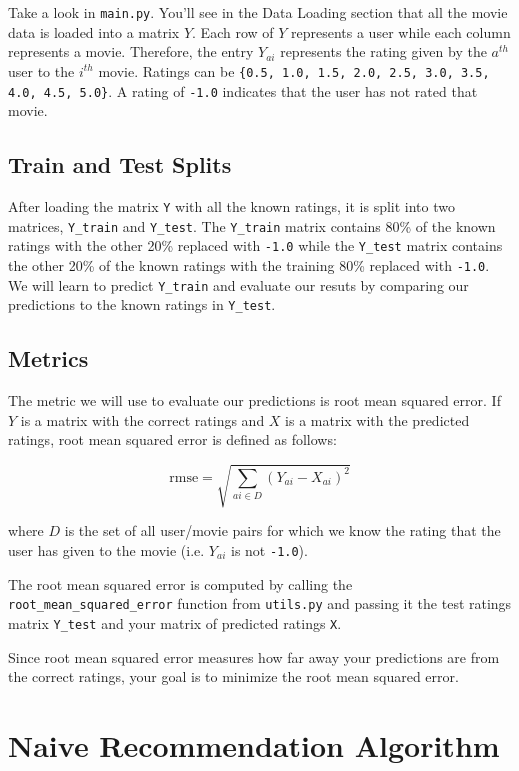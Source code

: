 \documentclass{article}
\begin{document}
Take a look in \texttt{main.py}. You'll see in the Data Loading section that all the movie data is loaded into a matrix $Y$. Each row of $Y$ represents a user while each column represents a movie. Therefore, the entry $Y_{ai}$ represents the rating given by the $a^{th}$ user to the $i^{th}$ movie. Ratings can be \texttt{\{0.5, 1.0, 1.5, 2.0, 2.5, 3.0, 3.5, 4.0, 4.5, 5.0\}}. A rating of \texttt{-1.0} indicates that the user has not rated that movie.

\subsection{Train and Test Splits}

After loading the matrix \texttt{Y} with all the known ratings, it is split into two matrices, \texttt{Y\_train} and \texttt{Y\_test}. The \texttt{Y\_train} matrix contains 80\% of the known ratings with the other 20\% replaced with \texttt{-1.0} while the \texttt{Y\_test} matrix contains the other 20\% of the known ratings with the training 80\% replaced with \texttt{-1.0}. We will learn to predict \texttt{Y\_train} and evaluate our resuts by comparing our predictions to the known ratings in \texttt{Y\_test}.

\subsection{Metrics}

The metric we will use to evaluate our predictions is root mean squared error. If $Y$ is a matrix with the correct ratings and $X$ is a matrix with the predicted ratings, root mean squared error is defined as follows:

$$\textrm{rmse} = \sqrt{\sum_{ai \in D} (Y_{ai} - X_{ai})^2}$$

\noindent
where $D$ is the set of all user/movie pairs for which we know the rating that the user has given to the movie (i.e. $Y_{ai}$ is not \texttt{-1.0}).

The root mean squared error is computed by calling the \texttt{root\_mean\_squared\_error} function from \texttt{utils.py} and passing it the test ratings matrix \texttt{Y\_test} and your matrix of predicted ratings \texttt{X}.

Since root mean squared error measures how far away your predictions are from the correct ratings, your goal is to minimize the root mean squared error.

\section{Naive Recommendation Algorithm} \label{naive}
\end{document}
